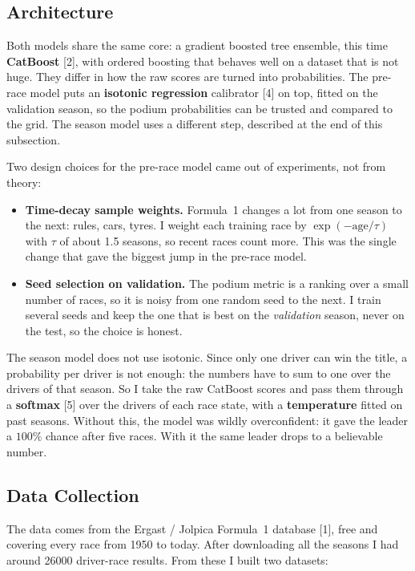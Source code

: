 \documentclass[10pt,twocolumn]{article}
\begin{document}
\subsection{Architecture}
Both models share the same core: a gradient boosted tree ensemble, this time
\textbf{CatBoost} [2], with ordered boosting that behaves well on a dataset that
is not huge. They differ in how the raw scores are turned into probabilities.
The pre-race model puts an \textbf{isotonic regression} calibrator [4] on top,
fitted on the validation season, so the podium probabilities can be trusted and
compared to the grid. The season model uses a different step, described at the
end of this subsection.

Two design choices for the pre-race model came out of experiments, not from
theory:

\begin{itemize}[leftmargin=1.2em,itemsep=2pt]
  \item \textbf{Time-decay sample weights.} Formula~1 changes a lot from one
        season to the next: rules, cars, tyres. I weight each training race by
        \(\exp(-\text{age}/\tau)\) with \(\tau\) of about 1.5 seasons, so recent
        races count more. This was the single change that gave the biggest jump
        in the pre-race model.
  \item \textbf{Seed selection on validation.} The podium metric is a ranking
        over a small number of races, so it is noisy from one random seed to the
        next. I train several seeds and keep the one that is best on the
        \emph{validation} season, never on the test, so the choice is honest.
\end{itemize}

The season model does not use isotonic. Since only one driver can win the title,
a probability per driver is not enough: the numbers have to sum to one over the
drivers of that season. So I take the raw CatBoost scores and pass them through
a \textbf{softmax} [5] over the drivers of each race state, with a
\textbf{temperature} fitted on past seasons. Without this, the model was wildly
overconfident: it gave the leader a \(100\%\) chance after five races. With it
the same leader drops to a believable number.

\subsection{Data Collection}
The data comes from the Ergast / Jolpica Formula~1 database [1], free and
covering every race from 1950 to today. After downloading all the seasons I had
around \num{26000} driver-race results. From these I built two datasets:
\end{document}
